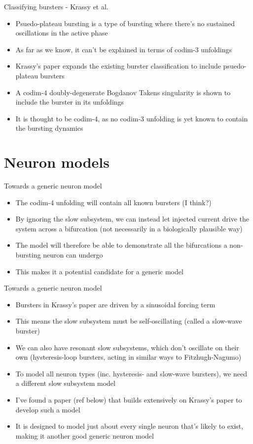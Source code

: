 \documentclass{beamer}
\begin{document}
\begin{frame}[label={sec:org49c7add}]{Classifying bursters - Krassy et al.}
\begin{itemize}
\item Psuedo-plateau bursting is a type of bursting where there's no sustained oscillations in the active phase
\item As far as we know, it can't be explained in terms of codim-3 unfoldings
\item Krassy's paper expands the existing burster classification to include psuedo-plateau bursters
\item A codim-4 doubly-degenerate Bogdanov Takens singularity is shown to include the burster in its unfoldings
\item It is thought to be codim-4, as no codim-3 unfolding is yet known to contain the bursting dynamics
\end{itemize}
\end{frame}


\section{Neuron models}
\label{sec:orge1a1f1c}
\begin{frame}[label={sec:orgdefed81}]{Towards a generic neuron model}
\begin{itemize}
\item The codim-4 unfolding will contain all known bursters (I think?)
\item By ignoring the slow subsystem, we can instead let injected current drive the system across a bifurcation (not necessarily in a biologically plausible way)
\item The model will therefore be able to demonstrate all the bifurcations a non-bursting neuron can undergo
\item This makes it a potential candidate for a generic model
\end{itemize}
\end{frame}

\begin{frame}[label={sec:orgcb6378d}]{Towards a generic neuron model}
\begin{itemize}[<+->]
\item Bursters in Krassy's paper are driven by a sinusoidal forcing term
\item This means the slow subsystem must be self-oscillating (called a slow-wave burster)
\item We can also have resonant slow subsystems, which don't oscillate on their own (hysteresis-loop bursters, acting in similar ways to Fitzhugh-Nagumo)
\item To model all neuron types (inc. hysteresis- and slow-wave bursters), we need a different slow subsystem model
\item I've found a paper (ref below) that builds extensively on Krassy's paper to develop such a model
\item It is designed to model just about every single neuron that's likely to exist, making it another good generic neuron model
\end{itemize}
\end{frame}
\end{document}
